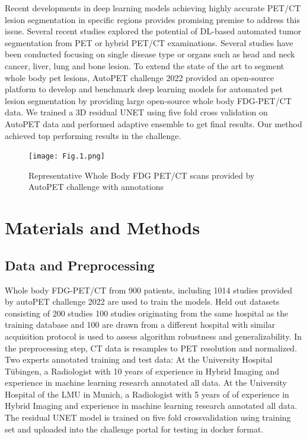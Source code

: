 \documentclass[runningheads]{llncs}
\begin{document}
Recent developments in deep learning models achieving highly accurate PET/CT lesion segmentation in specific regions provides promising premise to address this issue.  Several recent studies explored the potential of DL-based automated tumor segmentation from PET or hybrid PET/CT examinations. Several studies have been conducted focusing on single disease type or organs such as head and neck cancer, liver, lung and bone lesion. To extend the state of the art to segment whole body pet lesions, AutoPET challenge 2022 provided an open-source platform to develop and benchmark deep learning models for automated pet lesion segmentation by providing large open-source whole body FDG-PET/CT data. We trained a 3D residual UNET using five fold cross validation on AutoPET data and performed adaptive ensemble to get final results. Our method achieved top performing results in the challenge.

\begin{figure}
    \centering
    \texttt{[image: Fig.1.png]}
    \caption{Representative Whole Body FDG PET/CT scans provided by AutoPET challenge with annotations} \label{fig1}
\end{figure}


\section{Materials and Methods}
\subsection{Data and Preprocessing}
Whole body FDG-PET/CT from 900 patients, including 1014 studies provided by autoPET challenge 2022 are used to train the models. Held out datasets consisting of 200 studies 100 studies originating from the same hospital as the training database and 100 are drawn from a different hospital with similar acquisition protocol is used to assess algorithm robustness and generalizability. In the preprocessing step, CT data is resamples to PET resolution and normalized. Two experts annotated training and test data: At the University Hospital Tübingen, a Radiologist with 10 years of experience in Hybrid Imaging and experience in machine learning research annotated all data. At the University Hospital of the LMU in Munich, a Radiologist with 5 years of of experience in Hybrid Imaging and experience in machine learning research annotated all data. The residual UNET model is trained on five fold crossvalidation using training set and uploaded into the challenge portal for testing in docker format.
\end{document}
